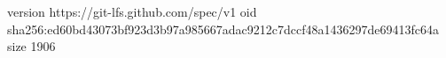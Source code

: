version https://git-lfs.github.com/spec/v1
oid sha256:ed60bd43073bf923d3b97a985667adac9212c7dccf48a1436297de69413fc64a
size 1906
